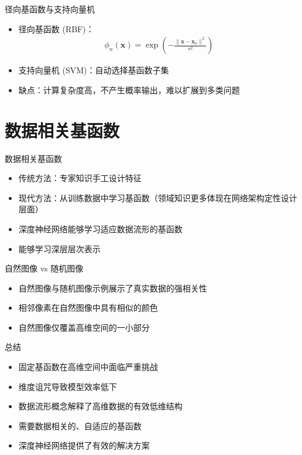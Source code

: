 \documentclass[t,aspectratio=169]{beamer} %
\begin{document}
\begin{frame}{径向基函数与支持向量机}
\begin{itemize}
    \item 径向基函数 (RBF)：
    \begin{align*}
        \phi_n(\mathbf{x}) = \exp\left( -\frac{\|\mathbf{x} - \mathbf{x}_n\|^2}{s^2} \right)
    \end{align*}
    
    \item 支持向量机 (SVM)：自动选择基函数子集
    \item 缺点：计算复杂度高，不产生概率输出，难以扩展到多类问题
\end{itemize}
\end{frame}

\section{数据相关基函数}
\begin{frame}{数据相关基函数}
\begin{itemize}
    \item 传统方法：专家知识手工设计特征
    \item 现代方法：从训练数据中学习基函数（领域知识更多体现在网络架构定性设计层面）
    \item 深度神经网络能够学习适应数据流形的基函数
    \item 能够学习深层层次表示
\end{itemize}
\end{frame}

\begin{frame}{自然图像 vs 随机图像}
\begin{itemize}
    \item 自然图像与随机图像示例展示了真实数据的强相关性
    \item 相邻像素在自然图像中具有相似的颜色
    \item 自然图像仅覆盖高维空间的一小部分
\end{itemize}
\end{frame}

\begin{frame}{总结}
\begin{itemize}
    \item 固定基函数在高维空间中面临严重挑战
    \item 维度诅咒导致模型效率低下
    \item 数据流形概念解释了高维数据的有效低维结构
    \item 需要数据相关的、自适应的基函数
    \item 深度神经网络提供了有效的解决方案
\end{itemize}
\end{frame}
\end{document}
